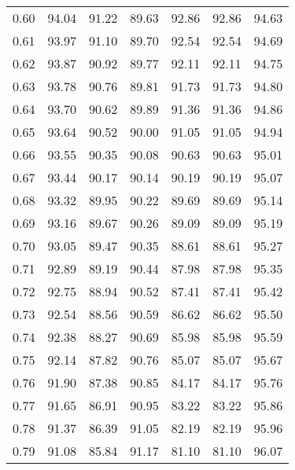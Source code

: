 \begin{tabular}{|c|c|c|c|c|c|c|}
      0.60 &     94.04 &     91.22 &      89.63 &   92.86 &      92.86 &         94.63 \\
      0.61 &     93.97 &     91.10 &      89.70 &   92.54 &      92.54 &         94.69 \\
      0.62 &     93.87 &     90.92 &      89.77 &   92.11 &      92.11 &         94.75 \\
      0.63 &     93.78 &     90.76 &      89.81 &   91.73 &      91.73 &         94.80 \\
      0.64 &     93.70 &     90.62 &      89.89 &   91.36 &      91.36 &         94.86 \\
      0.65 &     93.64 &     90.52 &      90.00 &   91.05 &      91.05 &         94.94 \\
      0.66 &     93.55 &     90.35 &      90.08 &   90.63 &      90.63 &         95.01 \\
      0.67 &     93.44 &     90.17 &      90.14 &   90.19 &      90.19 &         95.07 \\
      0.68 &     93.32 &     89.95 &      90.22 &   89.69 &      89.69 &         95.14 \\
      0.69 &     93.16 &     89.67 &      90.26 &   89.09 &      89.09 &         95.19 \\
      0.70 &     93.05 &     89.47 &      90.35 &   88.61 &      88.61 &         95.27 \\
      0.71 &     92.89 &     89.19 &      90.44 &   87.98 &      87.98 &         95.35 \\
      0.72 &     92.75 &     88.94 &      90.52 &   87.41 &      87.41 &         95.42 \\
      0.73 &     92.54 &     88.56 &      90.59 &   86.62 &      86.62 &         95.50 \\
      0.74 &     92.38 &     88.27 &      90.69 &   85.98 &      85.98 &         95.59 \\
      0.75 &     92.14 &     87.82 &      90.76 &   85.07 &      85.07 &         95.67 \\
      0.76 &     91.90 &     87.38 &      90.85 &   84.17 &      84.17 &         95.76 \\
      0.77 &     91.65 &     86.91 &      90.95 &   83.22 &      83.22 &         95.86 \\
      0.78 &     91.37 &     86.39 &      91.05 &   82.19 &      82.19 &         95.96 \\
      0.79 &     91.08 &     85.84 &      91.17 &   81.10 &      81.10 &         96.07 \\

\end{tabular}
